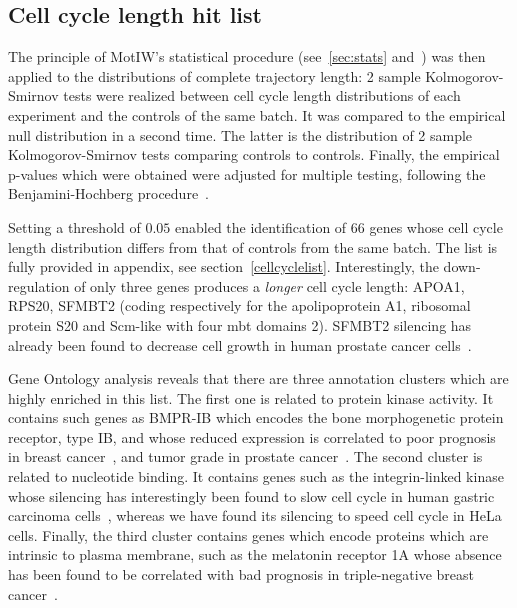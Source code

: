 \subsection{Cell cycle length hit list}
The principle of MotIW's statistical procedure (see~\ref{sec:stats} and~\cite{motiw}) was then applied to the distributions of complete trajectory length: 2 sample Kolmogorov-Smirnov tests were realized between cell cycle length distributions of each experiment and the controls of the same batch. It was compared to the empirical null distribution in a second time. The latter is the distribution of 2 sample Kolmogorov-Smirnov tests comparing controls to controls. Finally, the empirical p-values which were obtained were adjusted for multiple testing, following the Benjamini-Hochberg procedure~\cite{Benjamini1}.

Setting a threshold of $0.05$ enabled the identification of 66 genes whose cell cycle length distribution differs from that of controls from the same batch. The list is fully provided in appendix, see section~\ref{cellcyclelist}. Interestingly, the down-regulation of only three genes produces a \textit{longer} cell cycle length: APOA1, RPS20, SFMBT2 (coding respectively for the apolipoprotein A1, ribosomal protein S20 and Scm-like with four mbt domains 2). SFMBT2 silencing has already been found to decrease cell growth in human prostate cancer cells~\cite{pmid23385818}. 

Gene Ontology analysis reveals that there are three annotation clusters which are highly enriched in this list. The first one is related to protein kinase activity. It contains such genes as BMPR-IB which encodes the bone morphogenetic protein receptor, type IB, and whose reduced expression is correlated to poor prognosis in breast cancer~\cite{pmid19451094}, and tumor grade in prostate cancer~\cite{pmid10850425}. The second cluster is related to nucleotide binding. It contains genes such as the integrin-linked kinase whose silencing has interestingly been found to slow cell cycle in human gastric carcinoma cells~\cite{pmid23748822}, whereas we have found its silencing to speed cell cycle in HeLa cells. Finally, the third cluster contains genes which encode proteins which are intrinsic to plasma membrane, such as the melatonin receptor 1A whose absence has been found to be correlated with bad prognosis in triple-negative breast cancer~\cite{pmid23250547}.  

